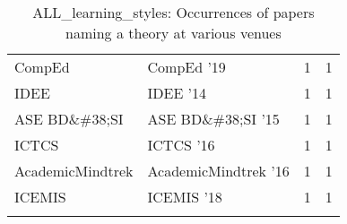 \begin{table*}[t]
\begin{tabular}{llrr}
\multirow{1}{*}{CompEd } & CompEd '19 & 1 & \multirow{1}{*}{1}\\
\multirow{1}{*}{IDEE } & IDEE '14 & 1 & \multirow{1}{*}{1}\\
\multirow{1}{*}{ASE BD\&\#38;SI } & ASE BD\&\#38;SI '15 & 1 & \multirow{1}{*}{1}\\
\multirow{1}{*}{ICTCS } & ICTCS '16 & 1 & \multirow{1}{*}{1}\\
\multirow{1}{*}{AcademicMindtrek } & AcademicMindtrek '16 & 1 & \multirow{1}{*}{1}\\
\multirow{1}{*}{ICEMIS } & ICEMIS '18 & 1 & \multirow{1}{*}{1}\\
\caption{ALL_learning_styles: Occurrences of papers naming a theory at various venues}
\end{tabular}
\end{table*}